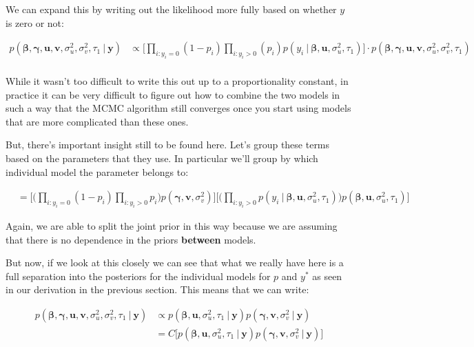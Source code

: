 \documentclass[12pt,twoside]{reedthesis}
\begin{document}
We can expand this by writing out the likelihood more fully based on whether \(y\) is zero or not:

\[
\begin{aligned}
p(\boldsymbol{\beta}, \boldsymbol{\gamma}, \mathbf{u}, \mathbf{v}, \sigma_u^2, \sigma_v^2, \tau_1 \ | \ \mathbf{y}) & \propto \bigg[\prod_{i:y_i = 0}(1-p_i)\prod_{i:y_i > 0}(p_i)p(y_i \ | \ \boldsymbol{\beta}, \mathbf{u}, \sigma_u^2, \tau_1)\bigg]\cdot  p(\boldsymbol{\beta}, \boldsymbol{\gamma}, \mathbf{u}, \mathbf{v}, \sigma_u^2, \sigma_v^2, \tau_1)\\
\end{aligned}
\]

While it wasn't too difficult to write this out up to a proportionality constant, in practice it can be very difficult to figure out how to combine the two models in such a way that the MCMC algorithm still converges once you start using models that are more complicated than these ones.

But, there's important insight still to be found here. Let's group these terms based on the parameters that they use. In particular we'll group by which individual model the parameter belongs to:

\[
\begin{aligned}
&= \Bigg[\Big(\prod_{i:y_i = 0}(1- p_i)\prod_{i: y_i > 0}p_i\Big)p(\boldsymbol{\gamma}, \mathbf{v}, \sigma_v^2)\Bigg]\Bigg[\Big(\prod_{i:y_i > 0}p(y_i \ | \ \boldsymbol{\beta}, \mathbf{u}, \sigma_u^2, \tau_1)\Big)p(\boldsymbol{\beta},\mathbf{u}, \sigma_u^2, \tau_1)\Bigg]
\end{aligned}
\]

Again, we are able to split the joint prior in this way because we are assuming that there is no dependence in the priors \textbf{between} models.

But now, if we look at this closely we can see that what we really have here is a full separation into the posteriors for the individual models for \(p\) and \(y^*\) as seen in our derivation in the previous section. This means that we can write:

\[
\begin{aligned}
p(\boldsymbol{\beta}, \boldsymbol{\gamma}, \mathbf{u}, \mathbf{v}, \sigma_u^2, \sigma_v^2, \tau_1\ | \ \mathbf{y})  &\propto p(\boldsymbol{\beta}, \mathbf{u}, \sigma_u^2, \tau_1 \ | \ \mathbf{y})p(\boldsymbol{\gamma}, \mathbf{v}, \sigma_v^2 \ | \ \mathbf{y}) \\
  &= C\bigg[p(\boldsymbol{\beta}, \mathbf{u}, \sigma_u^2, \tau_1 \ | \ \mathbf{y})p(\boldsymbol{\gamma}, \mathbf{v}, \sigma_v^2 \ | \ \mathbf{y})\bigg]
\end{aligned}
\]
\end{document}
